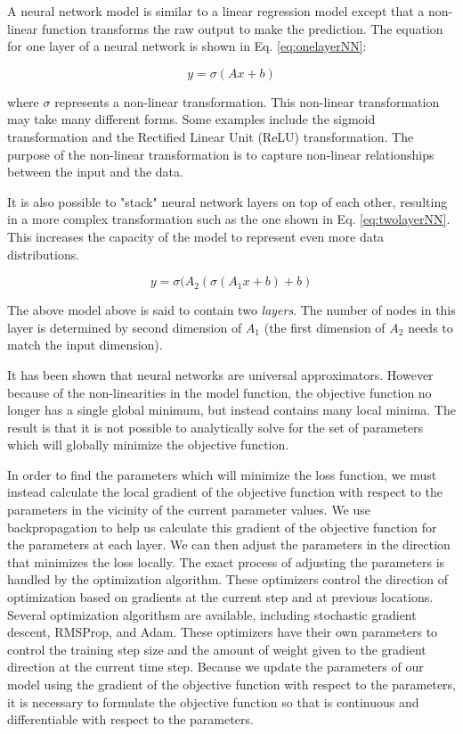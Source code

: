 A neural network model\cite{Schmidhuber_NN_Overview} is similar to a linear regression model except that a non-linear function transforms the raw output to make the prediction. The equation for one layer of a neural network is shown in Eq. \eqref{eq:onelayerNN}:

\begin{equation}\label{eq:onelayerNN}
y = \sigma( Ax + b)
\end{equation}

where $\sigma$ represents a non-linear transformation. This non-linear transformation may take many different forms. Some examples include the sigmoid transformation and the Rectified Linear Unit (ReLU) transformation\cite{Nair2010ReLU,lecun_efficient_backprop}. The purpose of the non-linear transformation is to capture non-linear relationships between the input and the data.

It is also possible to "stack" neural network layers on top of each other, resulting in a more complex transformation such as the one shown in Eq. \eqref{eq:twolayerNN}. This increases the capacity of the model to represent even more data distributions.

\begin{equation}\label{eq:twolayerNN}
y = \sigma( A_2 ( \sigma(A_1 x + b) + b)
\end{equation}

The above model above is said to contain two \textit{layers}. The number of nodes in this layer is determined by second dimension of $A_1$ (the first dimension of $A_2$ needs to match the input dimension).

It has been shown that neural networks are universal approximators\cite{Kolmogorov:57,hornik1989}. However because of the non-linearities in the model function, the objective function no longer has a single global minimum, but instead contains many local minima. The result is that it is not possible to analytically solve for the set of parameters which will globally minimize the objective function.

In order to find the parameters which will minimize the loss function, we must instead calculate the local gradient of the objective function with respect to the parameters in the vicinity of the current parameter values. We use backpropagation\cite{lecun_efficient_backprop} to help us calculate this gradient of the objective function for the parameters at each layer. We can then adjust the parameters in the direction that minimizes the loss locally.
The exact process of adjusting the parameters is handled by the optimization algorithm. These optimizers control the direction of optimization based on gradients at the current step and at previous locations. Several optimization algorithsm are available, including stochastic gradient descent, RMSProp\cite{Tieleman2012}, and Adam\cite{Kingma_adam_optimizer}.
These optimizers have their own parameters to control the training step size and the amount of weight given to the gradient direction at the current time step.
Because we update the parameters of our model using the gradient of the objective function with respect to the parameters, it is necessary to formulate the objective function so that is continuous and differentiable with respect to the parameters.


